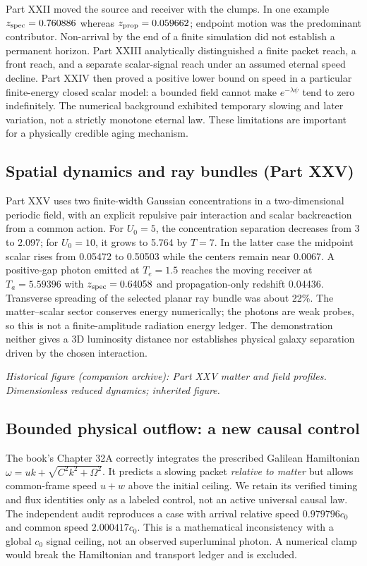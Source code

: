 \documentclass[
  11pt,
  twoside]{article}
\begin{document}
Part XXII moved the source and receiver with the clumps. In one example
\(z_{\rm spec}=0.760886\) whereas \(z_{\rm prop}=0.059662\); endpoint
motion was the predominant contributor. Non-arrival by the end of a
finite simulation did not establish a permanent horizon. Part XXIII
analytically distinguished a finite packet reach, a front reach, and a
separate scalar-signal reach under an assumed eternal speed decline.
Part XXIV then proved a positive lower bound on speed in a particular
finite-energy closed scalar model: a bounded field cannot make
\(e^{-\lambda\psi}\) tend to zero indefinitely. The numerical background
exhibited temporary slowing and later variation, not a strictly monotone
eternal law. These limitations are important for a physically credible
aging mechanism.

\subsection{Spatial dynamics and ray bundles (Part
XXV)}\label{spatial-dynamics-and-ray-bundles-part-xxv}

Part XXV uses two finite-width Gaussian concentrations in a
two-dimensional periodic field, with an explicit repulsive pair
interaction and scalar backreaction from a common action. For \(U_0=5\),
the concentration separation decreases from 3 to 2.097; for \(U_0=10\),
it grows to 5.764 by \(T=7\). In the latter case the midpoint scalar
rises from 0.05472 to 0.50503 while the centers remain near 0.0067. A
positive-gap photon emitted at \(T_e=1.5\) reaches the moving receiver
at \(T_a=5.59396\) with \(z_{\rm spec}=0.64058\) and propagation-only
redshift 0.04436. Transverse spreading of the selected planar ray bundle
was about 22\%. The matter--scalar sector conserves energy numerically;
the photons are weak probes, so this is not a finite-amplitude radiation
energy ledger. The demonstration neither gives a 3D luminosity distance
nor establishes physical galaxy separation driven by the chosen
interaction.

\emph{Historical figure (companion archive): Part XXV matter and field
profiles. Dimensionless reduced dynamics; inherited figure.}

\subsection{Bounded physical outflow: a new causal
control}\label{bounded-physical-outflow-a-new-causal-control}

The book's Chapter 32A correctly integrates the prescribed Galilean
Hamiltonian \(\omega=u k+\sqrt{C^2k^2+\Omega^2}\). It predicts a slowing
packet \emph{relative to matter} but allows common-frame speed \(u+w\)
above the initial ceiling. We retain its verified timing and flux
identities only as a labeled control, not an active universal causal
law. The independent audit reproduces a case with arrival relative speed
\(0.979796c_0\) and common speed \(2.000417c_0\). This is a mathematical
inconsistency with a global \(c_0\) signal ceiling, not an observed
superluminal photon. A numerical clamp would break the Hamiltonian and
transport ledger and is excluded.
\end{document}
